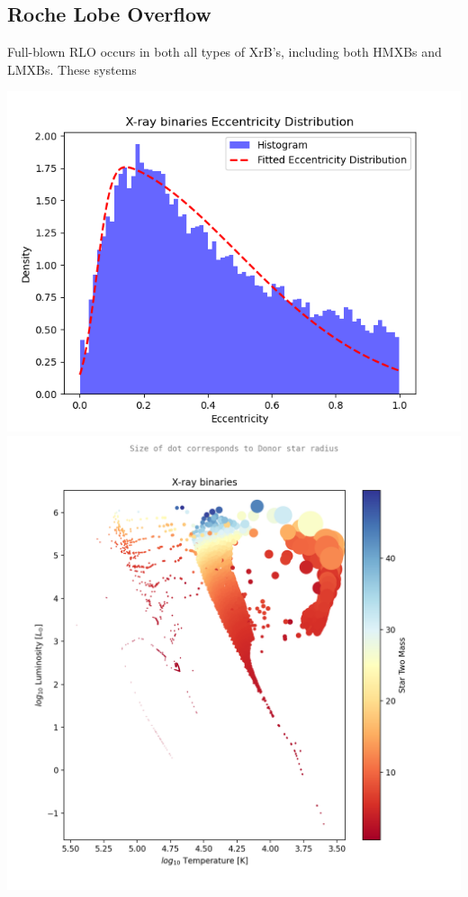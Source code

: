 \documentclass[12pt, letterpaper]{article}
\begin{document}
        \subsection{\centering Roche Lobe Overflow}
        Full-blown RLO occurs in both all types of XrB's, including both HMXBs and LMXBs. These systems 
        \begin{center}
            \includegraphics[scale=.5]{Figs/X-ray binaries Eccentricty Distribution.png}
            \includegraphics[scale=.5]{Figs/X-ray binaries S2mass log10 F star radius T.png}

\end{center}
\end{document}
